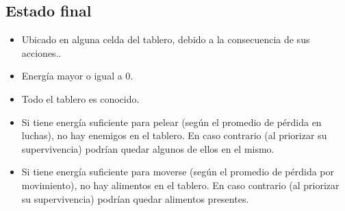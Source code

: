 \subsection{Estado final}

\begin{itemize}
\item Ubicado en alguna celda del tablero, debido a la consecuencia de sus acciones..
\item Energía mayor o igual a 0.
\item Todo el tablero es conocido.
\item Si tiene energía suficiente para pelear (según el promedio de pérdida en
luchas), no hay enemigos en el tablero. En caso contrario (al priorizar su
supervivencia) podrían quedar algunos de ellos en el mismo.
\item Si tiene energía suficiente para moverse (según el promedio de pérdida
por movimiento), no hay alimentos en el tablero. En caso contrario (al priorizar
su supervivencia) podrían quedar alimentos presentes.
\end{itemize}
